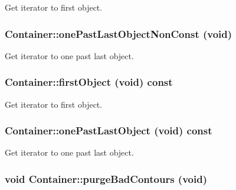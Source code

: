 Get iterator to first object. \hypertarget{classContainer_bf9778c6bfa5a23133ced6d5d8d66434}{
\subsubsection[onePastLastObjectNonConst]{ Container::onePastLastObjectNonConst (void)}}
\label{classContainer_bf9778c6bfa5a23133ced6d5d8d66434}


Get iterator to one past last object. \hypertarget{classContainer_b71691d8131f9f8b55f6b1c3fc15f347}{
\subsubsection[firstObject]{ Container::firstObject (void) const}}
\label{classContainer_b71691d8131f9f8b55f6b1c3fc15f347}


Get iterator to first object. \hypertarget{classContainer_56d09e1048b91a98d1103b6e4aea276e}{
\subsubsection[onePastLastObject]{ Container::onePastLastObject (void) const}}
\label{classContainer_56d09e1048b91a98d1103b6e4aea276e}


Get iterator to one past last object. \hypertarget{classContainer_6358cb40bedaead66e3a9294f9ffab00}{
\subsubsection[purgeBadContours]{\setlength{\rightskip}{0pt plus 5cm}void Container::purgeBadContours (void)}}
\label{classContainer_6358cb40bedaead66e3a9294f9ffab00}


